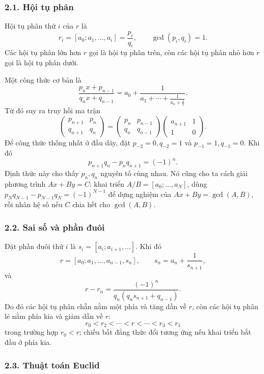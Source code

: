 \documentclass[11pt]{article}
\begin{document}
\subsubsection*{2.1. Hội tụ phân}

Hội tụ phân thứ \(i\) của \(r\) là
\[
  r_i=[a_0;a_1,\ldots,a_i]=\frac{p_i}{q_i},
  \qquad \gcd(p_i,q_i)=1.
\]
Các hội tụ phân lớn hơn \(r\) gọi là hội tụ phân trên, còn các hội tụ phân nhỏ
hơn \(r\) gọi là hội tụ phân dưới.

Một công thức cơ bản là
\[
  \frac{p_nx+p_{n-1}}{q_nx+q_{n-1}}
  =
  a_0+\frac{1}{a_1+\cdots+\frac{1}{a_n+\frac{1}{x}}}.
\]
Từ đó suy ra truy hồi ma trận
\[
 \begin{pmatrix}p_{n+1}&p_n\\ q_{n+1}&q_n\end{pmatrix}
 =
 \begin{pmatrix}p_n&p_{n-1}\\ q_n&q_{n-1}\end{pmatrix}
 \begin{pmatrix}a_{n+1}&1\\ 1&0\end{pmatrix}.
\]
Để công thức thống nhất ở đầu dãy, đặt \(p_{-2}=0,q_{-2}=1\) và
\(p_{-1}=1,q_{-1}=0\). Khi đó
\[
  p_{n+1}q_n-p_nq_{n+1}=(-1)^n.
\]
Định thức này cho thấy \(p_n,q_n\) nguyên tố cùng nhau. Nó cũng cho ta cách
giải phương trình \(Ax+By=C\): khai triển \(A/B=[a_0;\ldots,a_N]\), dùng
\(p_Nq_{N-1}-p_{N-1}q_N=(-1)^{N-1}\) để dựng nghiệm của
\(Ax+By=\gcd(A,B)\), rồi nhân hệ số nếu \(C\) chia hết cho \(\gcd(A,B)\).

\subsubsection*{2.2. Sai số và phần đuôi}

Đặt phần đuôi thứ \(i\) là \(s_i=[a_i;a_{i+1},\ldots]\). Khi đó
\[
  r=[a_0;a_1,\ldots,a_{n-1},s_n],
  \qquad
  s_n=a_n+\frac{1}{s_{n+1}},
\]
và
\[
  r-r_n=\frac{(-1)^n}{q_n(q_ns_{n+1}+q_{n-1})}.
\]
Do đó các hội tụ phân chẵn nằm một phía và tăng dần về \(r\), còn các hội tụ
phân lẻ nằm phía kia và giảm dần về \(r\):
\[
  r_0<r_2<\cdots<r<\cdots<r_3<r_1
\]
trong trường hợp \(r_0<r\); chiều bất đẳng thức đổi tương ứng nếu khai triển
bắt đầu ở phía kia.

\subsubsection*{2.3. Thuật toán Euclid}
\end{document}
